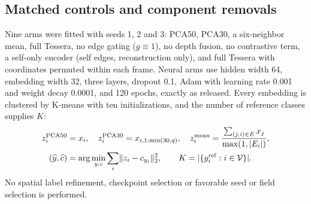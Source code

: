 \documentclass[11pt]{article}
\begin{document}
\subsection{Matched controls and component removals}
Nine arms were fitted with seeds 1, 2 and 3: PCA50, PCA30, a six-neighbor mean, full Tessera, no edge gating (\(g\equiv1\)), no depth fusion, no contrastive term, a self-only encoder (self edges, reconstruction only), and full Tessera with coordinates permuted within each frame. Neural arms use hidden width 64, embedding width 32, three layers, dropout 0.1, Adam with learning rate 0.001 and weight decay 0.0001, and 120 epochs, exactly as released. Every embedding is clustered by K-means with ten initializations, and the number of reference classes supplies \(K\):
\begin{align}
z_i^{\rm PCA50}&=x_i,\quad z_i^{\rm PCA30}=x_{i,1:\min(30,q)},\quad
z_i^{\rm mean}=\frac{\sum_{(j,i)\in E}x_j}{\max(1,|E_i|)},\label{eq:controls}\\
(\widehat y,\widehat c)&=\arg\min_{y,c}\sum_i\lVert z_i-c_{y_i}\rVert_2^2,
\qquad K=|\{y_i^{\rm ref}:i\in\mathcal V\}|.\label{eq:kmeans}
\end{align}
No spatial label refinement, checkpoint selection or favorable seed or field selection is performed.
\end{document}
